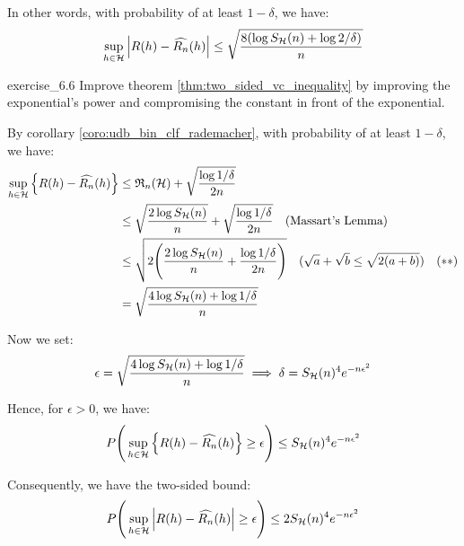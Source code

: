 \begin{solution*}
    \noindent In other words, with probability of at least $1-\delta$, we have:
    \begin{align*}
        \sup_{h\in\mathcal{H}} \Big| R(h) - \widehat{R_n}(h) \Big| \le \sqrt{
            \frac{8(\log S_{\mathcal{H}}(n) + \log 2/\delta)}{n}
        }
    \end{align*}
\end{solution*}

\begin{exercise}{}{exercise_6.6}
    Improve theorem \ref{thm:two_sided_vc_inequality} by improving the exponential's power and compromising the constant in front of the exponential.
\end{exercise}

\begin{solution*}
    By corollary \ref{coro:udb_bin_clf_rademacher}, with probability of at least $1-\delta$, we have:
    \begin{align*}
        \sup_{h\in\mathcal{H}}\Big\{ 
            R(h) - \widehat{R_n}(h)
         \Big\} &\le \mathfrak{R}_n(\mathcal{H}) + \sqrt{\frac{\log 1/\delta}{2n}} \\
        &\le \sqrt{\frac{2\log S_{\mathcal{H}}(n)}{n}} + \sqrt{\frac{\log 1/\delta}{2n}} \ \ \ \text{(Massart's Lemma)} \\
        &\le \sqrt{2\Bigg( 
            \frac{2\log S_{\mathcal{H}}(n)}{n} + \frac{\log 1/\delta}{2n}
         \Bigg)} \ \ \ (\sqrt{a} + \sqrt{b} \le \sqrt{2(a+b)}) \ \ \ (**) \\
        &= \sqrt{
            \frac{4\log S_{\mathcal{H}}(n) + \log 1/\delta}{n}
        } 
    \end{align*}

    \noindent Now we set:
    \begin{align*}
        \epsilon = \sqrt{
            \frac{4\log S_{\mathcal{H}}(n) + \log 1/\delta}{n}
        } \implies \delta = S_{\mathcal{H}}(n)^4e^{-n\epsilon^2}
    \end{align*}

    \noindent Hence, for $\epsilon>0$, we have:
    \begin{align*}
        P\Bigg( 
            \sup_{h\in\mathcal{H}}\Big\{ 
                R(h) - \widehat{R_n}(h)
             \Big\} \ge \epsilon
         \Bigg)\le S_{\mathcal{H}}(n)^4e^{-n\epsilon^2}
    \end{align*}

    \noindent Consequently, we have the two-sided bound:
    \begin{align*}
        P\Bigg( 
            \sup_{h\in\mathcal{H}}\Big| 
                R(h) - \widehat{R_n}(h)
             \Big| \ge \epsilon
         \Bigg)\le 2S_{\mathcal{H}}(n)^4e^{-n\epsilon^2}
    \end{align*}

    \noindent{}\color{black}
\end{solution*}
